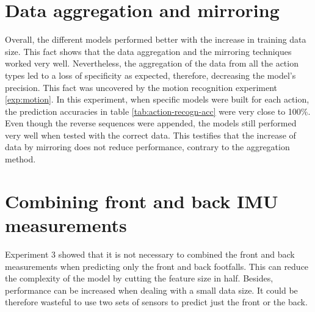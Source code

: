 \section{Data aggregation and mirroring}
Overall, the different models performed better with the increase in training data size. This fact shows that the data aggregation and the mirroring techniques worked very well. Nevertheless, the aggregation of the data from all the action types led to a loss of specificity as expected, therefore, decreasing the model's precision. This fact was uncovered by the motion recognition experiment \ref{exp:motion}. In this experiment, when specific models were built for each action, the prediction accuracies in table \ref{tab:action-recogn-acc} were very close to 100\%.\\
Even though the reverse sequences were appended, the models still performed very well when tested with the correct data. This testifies that the increase of data by mirroring does not reduce performance, contrary to the aggregation method.

\section{Combining front and back IMU measurements}
Experiment 3 showed that it is not necessary to combined the front and back measurements when predicting only the front and back footfalls.
This can reduce the complexity of the model by cutting the feature size in half. Besides, performance can be increased when dealing with a small data size.
It could be therefore wasteful to use two sets of sensors to predict just the front or the back.